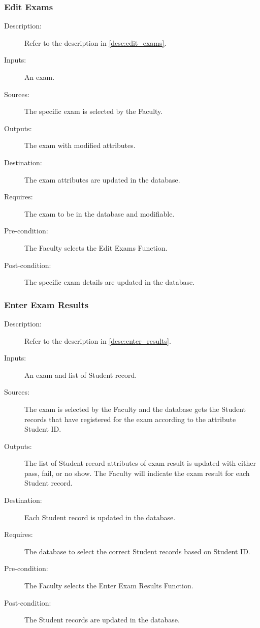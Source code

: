 \subsubsection{\large Edit Exams} 
\begin{boxed} %
\begin{description}
\item[Description:]
   Refer to the description in \autoref{desc:edit_exams}.
\item[Inputs:]
   An exam.
\item[Sources:]
   The specific exam is selected by the Faculty.
\item[Outputs:]
   The exam with modified attributes.
\item[Destination:]
   The exam attributes are updated in the database.
\item[Requires:]
   The exam to be in the database and modifiable.
\item[Pre-condition:]
   The Faculty selects the Edit Exams Function.
\item[Post-condition:]
   The specific exam details are updated in the database.
\end{description}
\end{boxed} %

\subsubsection{\large Enter Exam Results} 
\begin{boxed} %
\begin{description}
\item[Description:]
   Refer to the description in \autoref{desc:enter_results}.
\item[Inputs:]
   An exam and list of Student record.
\item[Sources:]
   The exam is selected by the Faculty and the database gets the Student
   records that have registered for the exam according to the attribute
   Student ID.
\item[Outputs:]
   The list of Student record attributes of exam result is updated with
   either pass, fail, or no show. The Faculty will indicate the exam result for each
   Student record.
\item[Destination:]
   Each Student record is updated in the database.
\item[Requires:]
   The database to select the correct Student records based on Student ID.
\item[Pre-condition:]
   The Faculty selects the Enter Exam Results Function.
\item[Post-condition:]
   The Student records are updated in the database.
\end{description}
\end{boxed} %

